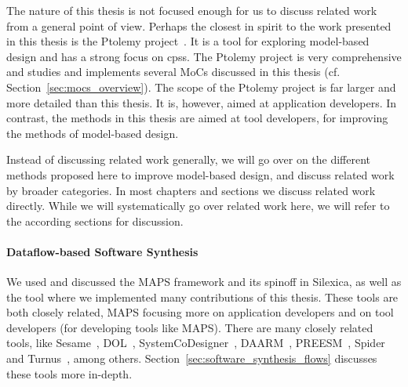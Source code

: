 The nature of this thesis is not focused enough for us to discuss related work from a general point of view.
Perhaps the closest in spirit to the work presented in this thesis is the Ptolemy project~\cite{Ptolemaeus:14:SystemDesign}.
It is a tool for exploring model-based design and has a strong focus on \acp{cps}.
The Ptolemy project is very comprehensive and studies and implements several \acp{MoC} discussed in this thesis (cf. Section~\ref{sec:mocs_overview}).
The scope of the Ptolemy project is far larger and more detailed than this thesis.
It is, however, aimed at application developers.
In contrast, the methods in this thesis are aimed at tool developers, for improving the methods of model-based design.

Instead of discussing related work generally, we will go over on the different methods proposed here to improve model-based design, and discuss related work by broader categories.
In most chapters and sections we discuss related work directly.
While we will systematically go over related work here, we will refer to the according sections for discussion.

\paragraph{Dataflow-based Software Synthesis}
We used and discussed the \ac{MAPS} framework and its spinoff in Silexica, as well as the \mocasin tool where we implemented many contributions of this thesis.
These tools are both closely related, \ac{MAPS} focusing more on application developers and \mocasin on tool developers (for developing tools like \ac{MAPS}).
There are many closely related tools, like Sesame~\cite{pimentel2006systematic}, DOL~\cite{thiele2007DOL}, SystemCoDesigner~\cite{haubelt2008systemcodesigner}, DAARM~\cite{weichslgartner2014daarm}, PREESM~\cite{pelcat2014preesm}, Spider~\cite{heulot2014spider} and Turnus~\cite{casale2013turnus}, among others.
Section~\ref{sec:software_synthesis_flows} discusses these tools more in-depth.

